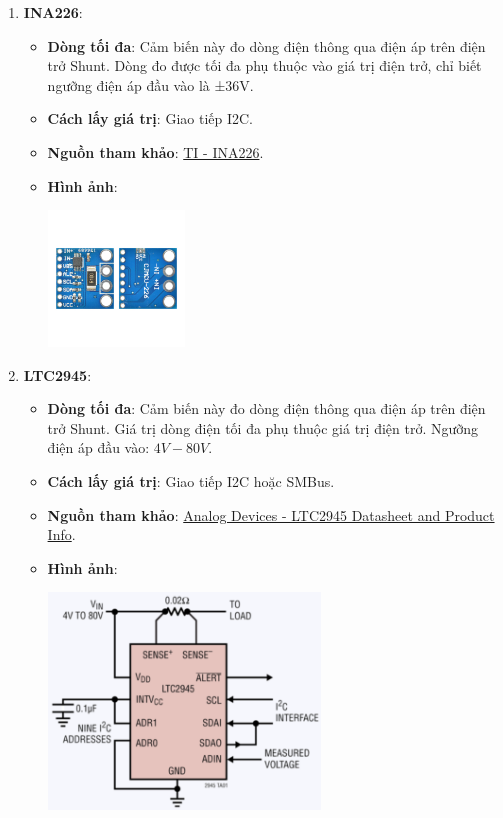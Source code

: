 \begin{enumerate}
    \item \textbf{INA226}:
    \begin{itemize}
        \item \textbf{Dòng tối đa}: Cảm biến này đo dòng điện thông qua điện áp trên điện trở Shunt. Dòng đo được tối đa phụ thuộc vào giá trị điện trở, chỉ biết ngưỡng điện áp đầu vào là ±36V.
        \item \textbf{Cách lấy giá trị}: Giao tiếp I2C.
        \item \textbf{Nguồn tham khảo}: \href{https://www.ti.com/product/INA226}{TI - INA226}.
        \item \textbf{Hình ảnh}:
        \begin{center}
            \includegraphics[width=0.3\textwidth]{graphics/section5/ina226.png}
        \end{center}
    \end{itemize}

    \item \textbf{LTC2945}:
    \begin{itemize}
        \item \textbf{Dòng tối đa}: Cảm biến này đo dòng điện thông qua điện áp trên điện trở Shunt. Giá trị dòng điện tối đa phụ thuộc giá trị điện trở. Ngưỡng điện áp đầu vào: $4V - 80V$.
        \item \textbf{Cách lấy giá trị}: Giao tiếp I2C hoặc SMBus.
        \item \textbf{Nguồn tham khảo}: \href{https://www.analog.com/en/products/ltc2945.html}{Analog Devices - LTC2945 Datasheet and Product Info}.
        \item \textbf{Hình ảnh}:
        \begin{center}
            \includegraphics[width=0.6\textwidth]{graphics/section5/ltc2945.png}
        \end{center}
    \end{itemize}


\end{enumerate}
